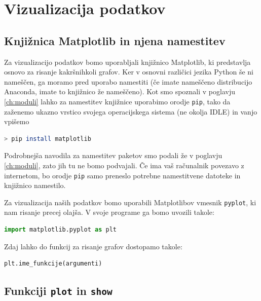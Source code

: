 \chapter{Vizualizacija podatkov}

\section{Knjižnica Matplotlib in njena namestitev}
Za vizualizacijo podatkov bomo uporabljali knjižnico Matplotlib, ki predstavlja osnovo za risanje kakršnihkoli grafov. Ker v osnovni različici jezika Python še ni nameščen, ga moramo pred uporabo namestiti (če imate nameščeno distribucijo Anaconda, imate to knjižnico že nameščeno). Kot smo spoznali v poglavju \ref{ch:moduli} lahko za namestitev knjižnice uporabimo orodje \texttt{pip}, tako da zaženemo ukazno vrstico svojega operacijskega sistema (ne okolja IDLE) in vanjo vpišemo
\begin{lstlisting}[language=bash]
> pip install matplotlib
\end{lstlisting}
Podrobnejša navodila za namestitev paketov smo podali že v poglavju \ref{ch:moduli}, zato jih tu ne bomo podvajali. Če ima vaš računalnik povezavo z internetom, bo orodje \texttt{pip} samo preneslo potrebne namestitvene datoteke in knjižnico namestilo.

Za vizualizacija naših podatkov bomo uporabili Matplotlibov vmesnik  \texttt{pyplot}, ki nam risanje precej olajša. V svoje programe ga bomo uvozili takole:
\begin{lstlisting}[language=Python, showstringspaces=false]
import matplotlib.pyplot as plt
\end{lstlisting}
Zdaj lahko do funkcij za risanje grafov dostopamo takole:
\begin{lstlisting}[language=Python, showstringspaces=false]
plt.ime_funkcije(argumenti)
\end{lstlisting}

\section{Funkciji \texttt{plot} in \texttt{show}}

